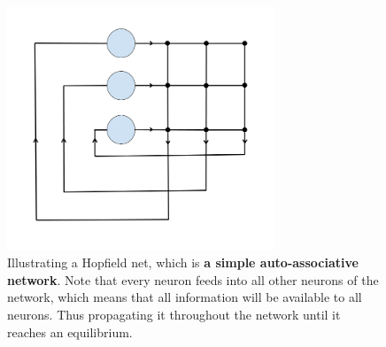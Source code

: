 \begin{figure}
    \centering
    \includegraphics[width=8cm]{fig/hopfield-net.png}
    \caption{Illustrating a Hopfield net, which is \textbf{a simple auto-associative network}. Note that every neuron feeds into all other neurons of the network, which means that all information will be available to all neurons. Thus propagating it throughout the network until it reaches an equilibrium.}
    \label{fig:hopfield-net}
\end{figure}

